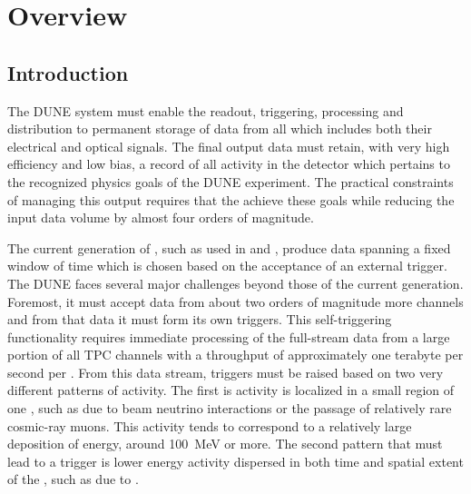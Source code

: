 \section{Overview}
\label{sec:fd-daq-ov}


\subsection{Introduction}
\label{sec:fd-daq-intro}

The DUNE   system must enable the readout,
triggering, processing and distribution to permanent storage of data
from all  which includes both their electrical
 and optical  signals.  
The final output data must retain, with very high efficiency and low
bias, a record of all activity in the detector which pertains to the
recognized physics goals of the DUNE experiment. 
The practical constraints of managing this output requires that the
 achieve these goals while reducing the input data volume by almost four
orders of magnitude.

The current generation of \lartpc {}, such as used in
 and \microboone, produce data spanning a fixed window of
time which is chosen based on the acceptance of an external trigger. 
The DUNE  faces several major challenges beyond those of the
current generation. 
Foremost, it must accept data from about two orders of magnitude more
channels and from that data it must form its own triggers.
This self-triggering functionality requires immediate processing of
the full-stream data from a large portion of all TPC channels with a
throughput of approximately one terabyte per second per
. 
From this data stream, triggers must be raised based on two very
different patterns of activity. 
The first is activity %
is localized in a small region of one
, such as due to beam neutrino interactions or the
passage of relatively rare cosmic-ray muons. 
This activity tends to correspond to a relatively large deposition of
energy, around \SI{100}{\MeV} or more. 
The second pattern that must lead to a trigger is lower energy activity
dispersed in both time and spatial extent of the , such as due to
.

